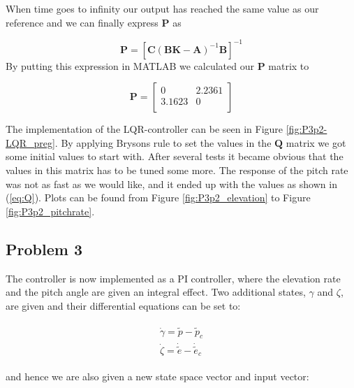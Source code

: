 When time goes to infinity our output has reached the same value as our reference and we can finally express $\bm{P}$ as

\begin{equation}
  \boldsymbol{P} = [\boldsymbol{C}(\boldsymbol{BK} -
  \boldsymbol{A})^{-1}\boldsymbol{B}]^{-1}
\end{equation}
\newline
By putting this expression in MATLAB we calculated our $\bm{P}$ matrix to

\begin{equation}
    \bm{P} = 
      \begin{bmatrix}
    0 & 2.2361 \\
    3.1623 & 0 \\
  \end{bmatrix}
\end{equation}

\newpage

 The implementation of the LQR-controller can be seen in Figure \ref{fig:P3p2-LQR_preg}. \newline
 By applying Brysons rule to set the values in the $\bm{Q}$ matrix we got some initial values to start with. After several tests it became obvious that the values in this matrix has to be tuned some more. The response of the pitch rate was not as fast as we would like, and it ended up with the values as shown in (\ref{eq:Q}). Plots can be found from Figure \ref{fig:P3p2_elevation} to Figure \ref{fig:P3p2_pitchrate}.


\subsection{Problem 3}

The controller is now implemented as a PI controller, where the elevation rate and the pitch angle are given an integral effect. Two additional states, $\gamma$ and $\zeta$, are given and their differential equations can be set to:

\begin{align}
  \begin{split}
    \dot{\gamma} = \tilde{p}-\tilde{p}_c \\
    \dot{\zeta} = \dot{\tilde{e}}-\dot{\tilde{e}}_c
  \end{split}
\end{align}

\newline

and hence we are also given a new state space vector and input vector:


